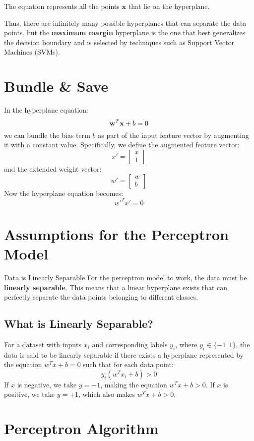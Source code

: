 The equation represents all the points \(\mathbf{x}\) that lie on the hyperplane.

Thus, there are infinitely many possible hyperplanes that can separate the data points, but the \textbf{maximum margin} hyperplane is the one that best generalizes the decision boundary and is selected by techniques such as Support Vector Machines (SVMs).
\section{Bundle \& Save}

In the hyperplane equation:
\[
{\bf w}^T {\bf x} + b = 0
\]
we can bundle the bias term \( b \) as part of the input feature vector by augmenting it with a constant value. Specifically, we define the augmented feature vector:
\[
x' = \begin{bmatrix} x \\ 1 \end{bmatrix}
\]
and the extended weight vector:
\[
w' = \begin{bmatrix} w \\ b \end{bmatrix}
\]
Now the hyperplane equation becomes:
\[
w'^T x' = 0
\]

\section{Assumptions for the Perceptron Model}

Data is Linearly Separable
For the perceptron model to work, the data must be \textbf{linearly separable}. This means that a linear hyperplane exists that can perfectly separate the data points belonging to different classes. 

\subsection{What is Linearly Separable?}
For a dataset with inputs \( x_i \) and corresponding labels \( y_i \), where \( y_i \in \{-1, 1\} \), the data is said to be linearly separable if there exists a hyperplane represented by the equation \( w^T x + b = 0 \) such that for each data point:
\[
y_i (w^T x_i + b) > 0
\]
If \( x \) is negative, we take \( y = -1 \), making the equation \( w^T x + b > 0 \).  
If \( x \) is positive, we take \( y = +1 \), which also makes \( w^T x + b > 0 \).


\section{Perceptron Algorithm}

